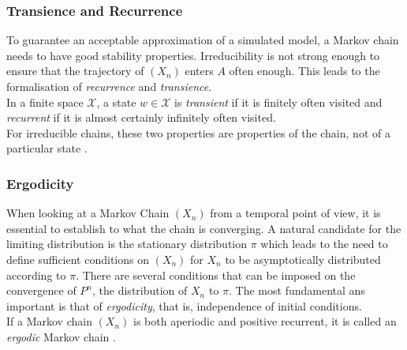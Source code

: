  \subsubsection{Transience and Recurrence} 
To guarantee an acceptable approximation of a simulated model, a Markov chain needs to have good stability properties. Irreducibility is not strong enough to ensure that the trajectory of $\left(X_n\right)$ enters $A$ often enough. This leads to the formalisation of \textit{recurrence} and \textit{transience}.  \\
In a finite space $\mathcal{X}$, a state $w\in\mathcal{X}$ is \textit{transient} if it is finitely often visited and \textit{recurrent} if it is almost certainly infinitely often visited. \\
For irreducible chains, these two properties are properties of the chain, not of a particular state \autocite[][218--219]{robert2013monte}.
\subsubsection{Ergodicity}
When looking at a Markov Chain $\left(X_n\right)$ from a temporal point of view, it is essential to establish to what the chain is converging. A natural candidate for the limiting distribution is the stationary distribution $\pi$ which leads to the need to define sufficient conditions on $\left(X_n\right)$ for $X_n$ to be asymptotically distributed according to $\pi$. There are several conditions that can be imposed on the convergence of $P^n$, the distribution of $X_n$ to $\pi$. The most fundamental ans important is that of \textit{ergodicity}, that is, independence of initial conditions.\\
If a Markov chain $\left(X_n\right)$ is both aperiodic and positive recurrent, it is called an \textit{ergodic} Markov chain \autocite[][231--234]{robert2013monte}.
